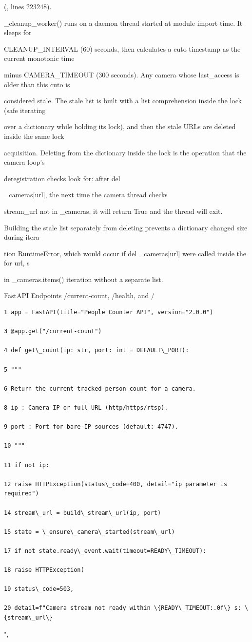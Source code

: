(, lines 223248).

\_cleanup\_worker() runs on a daemon thread started at module import time. It sleeps for

CLEANUP\_INTERVAL (60) seconds, then calculates a cuto timestamp as the current monotonic time

minus CAMERA\_TIMEOUT (300 seconds). Any camera whose last\_access is older than this cuto is

considered stale. The stale list is built with a list comprehension inside the lock (safe  iterating

over a dictionary while holding its lock), and then the stale URLs are deleted inside the same lock

acquisition. Deleting from the dictionary inside the lock is the operation that the camera loop's

deregistration checks look for: after del

\_cameras[url], the next time the camera thread checks

stream\_url not in \_cameras, it will return True and the thread will exit.

Building the stale list separately from deleting prevents a dictionary changed size during itera-

tion RuntimeError, which would occur if del \_cameras[url] were called inside the for url, s

in \_cameras.items() iteration without a separate list.

FastAPI Endpoints  /current-count, /health, and /

\begin{listingbox}
	\begin{verbatim}
1 app = FastAPI(title="People Counter API", version="2.0.0")

3 @app.get("/current-count")

4 def get\_count(ip: str, port: int = DEFAULT\_PORT):

5 """

6 Return the current tracked-person count for a camera.

8 ip : Camera IP or full URL (http/https/rtsp).

9 port : Port for bare-IP sources (default: 4747).

10 """

11 if not ip:

12 raise HTTPException(status\_code=400, detail="ip parameter is required")

14 stream\_url = build\_stream\_url(ip, port)

15 state = \_ensure\_camera\_started(stream\_url)

17 if not state.ready\_event.wait(timeout=READY\_TIMEOUT):

18 raise HTTPException(

19 status\_code=503,

20 detail=f"Camera stream not ready within \{READY\_TIMEOUT:.0f\} s: \{stream\_url\}

\end{verbatim}
\end{listingbox}
",

